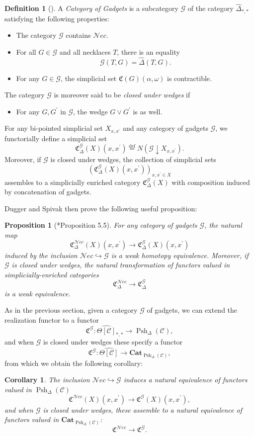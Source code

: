 \documentclass[a4paper]{article}
\numberwithin{equation}{subsection}
\theoremstyle{plain}   %
\newtheorem{prop}[equation]{Proposition}
\newtheorem{cor}[equation]{Corollary}
\theoremstyle{definition}
\newtheorem{defn}[equation]{Definition}
\theoremstyle{remark}
\theoremstyle{plain}
\newcommand{\Nec}{\ensuremath{{\mathcal{N}ec}}}
\newcommand{\Cat}{\ensuremath{\mathbf{Cat}}}
\newcommand{\overcat}[2]{{\left(#1\downarrow #2\right)}}
\newcommand{\psh}[1]{\ensuremath{\widehat{#1}}}
\newcommand{\defeq}{\overset{\mathrm{def}}=}
\newcommand{\cellset}{\ensuremath{\widehat{\Theta[\mathcal{C}]}}}
\newcommand{\spsh}{\ensuremath{\operatorname{Psh}_\Delta(\mathcal{C})}}
\begin{document}
\begin{defn}[\cite{ds1}]
	A \emph{Category of Gadgets} is a subcategory \(\mathcal{G}\) of the category \(\psh{\Delta}_{\ast,\ast}\) satisfying the following properties:
	\begin{itemize}
		\item The category \(\mathcal{G}\) contains \(\Nec\).
		\item For all \(G\in \mathcal{G}\) and all necklaces \(T\), there is an equality 
		\[
			\mathcal{G}(T,G) = \psh{\Delta}(T,G).
		\]
		\item For any \(G \in \mathcal{G}\), the simplicial set \(\mathfrak{C}(G)(\alpha,\omega)\) is contractible.
	\end{itemize}
	The category \(\mathcal{G}\) is moreover said to be \emph{closed under wedges} if
	\begin{itemize}
		\item For any \(G, G^\prime\) in \(\mathcal{G}\), the wedge \(G\vee G^\prime\) is as well.
	\end{itemize}
	For any bi-pointed simplicial set \(X_{x,x^\prime}\) and any category of gadgets \(\mathcal{G}\), we functorially define a simplicial set 
	\[
		\mathfrak{C}^{\mathcal{G}}_\Delta(X)(x,x^\prime)\defeq N\overcat{\mathcal{G}}{X_{x,x^\prime}}.
	\]
	Moreover, if \(\mathcal{G}\) is closed under wedges, the collection of simplicial sets 
	\[
		(\mathfrak{C}^{\mathcal{G}}_\Delta(X)(x,x^\prime))_{x,x^\prime \in X}
	\]
	assembles to a simplicially enriched category \(\mathfrak{C}^{\mathcal{G}}_\Delta(X)\) with composition induced by concatenation of gadgets.
\end{defn}

Dugger and Spivak then prove the following useful proposition:

\begin{prop}[\cite{ds1}*{Proposition 5.5}]
	For any category of gadgets \(\mathcal{G}\), the natural map
	\[\mathfrak{C}^{\Nec}_\Delta(X)(x,x^\prime)\to \mathfrak{C}^{\mathcal{G}}_\Delta(X)(x,x^\prime)\]
	induced by the inclusion \(\Nec \hookrightarrow \mathcal{G}\) is a weak homotopy equivalence.  Moreover, if \(\mathcal{G}\) is closed under wedges, the natural transformation of functors valued in simplicially-enriched categories
	\[\mathfrak{C}^{\Nec}_\Delta\to \mathfrak{C}^{\mathcal{G}}_\Delta\]
	is a weak equivalence.
\end{prop}

As in the previous section, given a category \(\mathcal{G}\) of gadgets, we can extend the realization functor to a functor
\[
	\mathfrak{C}^\mathcal{G}:\cellset_{\ast,\ast} \to \spsh,
\]
and when \(\mathcal{G}\) is closed under wedges these specify a functor
\[
	\mathfrak{C}^\mathcal{G}:\cellset \to \Cat_{\spsh},
\]
from which we obtain the following corollary:
\begin{cor}\label{gadgetlemma}
	The inclusion \(\Nec\hookrightarrow \mathcal{G}\) induces a natural equivalence of functors valued in \(\spsh\)
	\[\mathfrak{C}^{\Nec}(X)(x,x^\prime)\to \mathfrak{C}^{\mathcal{G}}(X)(x,x^\prime),\]
	and when \(\mathcal{G}\) is closed under wedges, these assemble to a natural equivalence of functors valued in \(\Cat_{\spsh}\):
	\[\mathfrak{C}^{\Nec}\to \mathfrak{C}^{\mathcal{G}}.\]
\end{cor}
\end{document}
